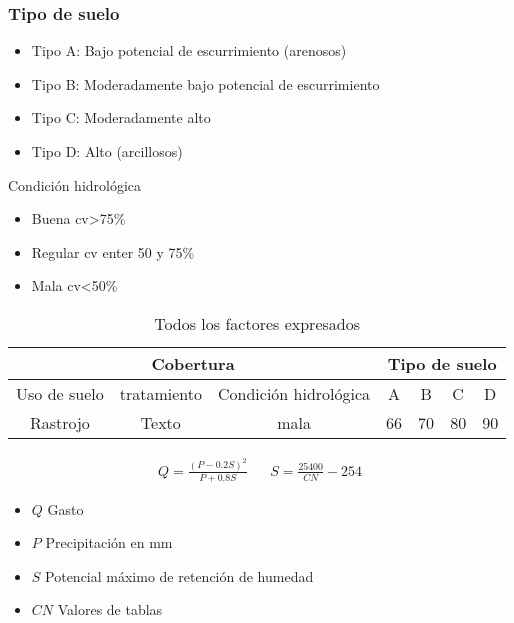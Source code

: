     \subsubsection{Tipo de suelo}
    \begin{itemize}
        \item Tipo A: Bajo potencial de escurrimiento (arenosos)
        \item Tipo B: Moderadamente bajo potencial de escurrimiento
        \item Tipo C: Moderadamente alto
        \item Tipo D: Alto (arcillosos)
    \end{itemize}
    Condición hidrológica
    \begin{itemize}
        \item Buena cv>75\%
        \item Regular cv enter 50 y 75\%
        \item Mala cv<50\%
    \end{itemize}
    \begin{table}[h!]
        \centering
        \begin{tabular}{@{}ccccccc@{}}
        \toprule
        \multicolumn{3}{c}{Cobertura}                      & \multicolumn{4}{c}{Tipo de suelo} \\ \midrule
        Uso de suelo & tratamiento & Condición hidrológica & A      & B      & C      & D      \\
        Rastrojo        & Texto       & mala                 & 66     & 70     & 80     & 90     \\ \bottomrule
        \end{tabular}
        \caption{Todos los factores expresados}
        \label{tabcsa13}
        \end{table}
    \begin{align}
        Q = \frac{(P - 0.2S)^2}{P + 0.8S}&&S = \frac{25400}{CN} - 254
    \end{align}
    \begin{notation}
        \begin{itemize}
            \item $Q$ Gasto
            \item $P$ Precipitación en mm
            \item $S$ Potencial máximo de retención de humedad
            \item $CN$ Valores de tablas
        \end{itemize}
    \end{notation}
